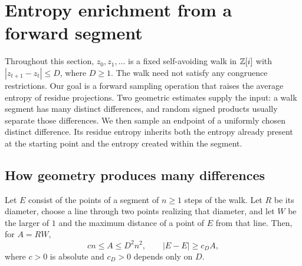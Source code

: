 \section{Entropy enrichment from a forward segment}\label{sec:geometry}

Throughout this section, \(z_0,z_1,\ldots\) is a fixed self-avoiding walk
in \(\mathbb Z[i]\) with \(|z_{t+1}-z_t|\le D\), where \(D\ge1\).
The walk need not satisfy any congruence restrictions.
Our goal is a forward sampling operation that raises the average
entropy of residue projections. Two geometric estimates supply the
input: a walk segment has many distinct differences, and random signed
products usually separate those differences. We then sample an endpoint
of a uniformly chosen distinct difference. Its residue entropy inherits
both the entropy already present at the starting point and the entropy
created within the segment.

\subsection{How geometry produces many differences}

\begin{lemma}\label{lem:differences}
Let \(E\) consist of the points of a segment of \(n\ge1\) steps of the
walk. Let \(R\) be its diameter, choose a line through two points
realizing that diameter, and let \(W\) be the larger of \(1\) and the
maximum distance of a point of \(E\) from that line. Then, for \(A=RW\),
\[
 c n\le A\le D^2n^2,
 \qquad |E-E|\ge c_D A,
\]
where \(c>0\) is absolute and \(c_D>0\) depends only on \(D\).
\end{lemma}

